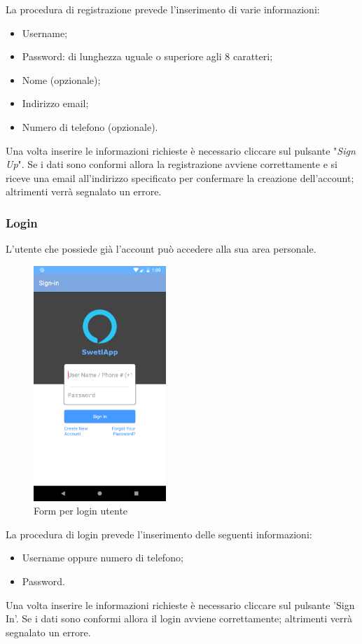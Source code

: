 La procedura di registrazione prevede l'inserimento di varie informazioni:
\begin{itemize}
	\item Username;
	\item Password: di lunghezza uguale o superiore agli 8 caratteri;
	\item Nome (opzionale);
	\item Indirizzo email;
	\item Numero di telefono (opzionale).
\end{itemize}
Una volta inserire le informazioni richieste è necessario cliccare sul pulsante "\textit{Sign Up}". Se i dati sono conformi allora la registrazione avviene correttamente e si riceve una email all'indirizzo specificato per confermare la creazione dell'account; altrimenti verrà segnalato un errore.
\subsubsection{Login}
\label{sec:funzionalita_applicazione_login}
L'utente che possiede già l'account può accedere alla sua area personale. 
\begin{figure}[H]
	\centering
	\includegraphics[width=5cm]{../includes/pics/app_login_form.png}
	\caption{\label{fig:app_login_form}Form per login utente}
\end{figure}
La procedura di login prevede l'inserimento delle seguenti informazioni:
\begin{itemize}
	\item Username oppure numero di telefono;
	\item Password.
\end{itemize}
Una volta inserire le informazioni richieste è necessario cliccare sul pulsante 'Sign In'. Se i dati sono conformi allora il login avviene correttamente; altrimenti verrà segnalato un errore. 
